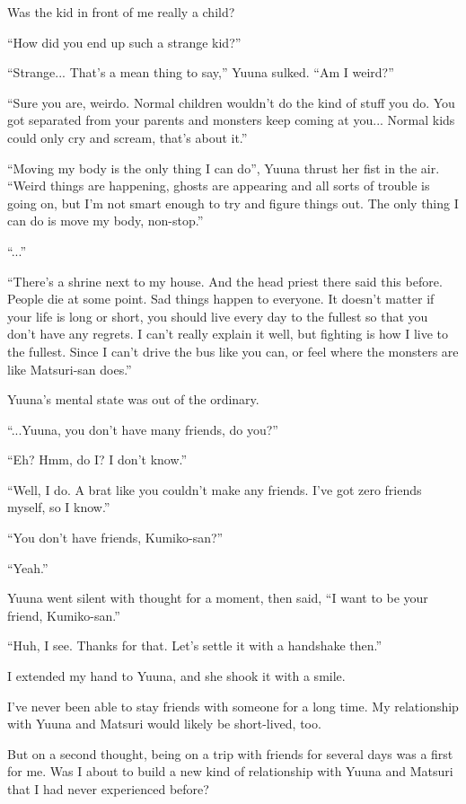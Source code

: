 Was the kid in front of me really a child?

``How did you end up such a strange kid?''

``Strange... That's a mean thing to say,'' Yuuna sulked. ``Am I weird?''

``Sure you are, weirdo. Normal children wouldn't do the kind of stuff you do. You got separated from your parents and monsters keep coming at you... Normal kids could only cry and scream, that's about it.''

``Moving my body is the only thing I can do'', Yuuna thrust her fist in the air. ``Weird things are happening, ghosts are appearing and all sorts of trouble is going on, but I'm not smart enough to try and figure things out. The only thing I can do is move my body, non-stop.''

``...''

``There's a shrine next to my house. And the head priest there said this before. People die at some point. Sad things happen to everyone. It doesn't matter if your life is long or short, you should live every day to the fullest so that you don't have any regrets. I can't really explain it well, but fighting is how I live to the fullest. Since I can't drive the bus like you can, or feel where the monsters are like Matsuri-san does.''

Yuuna's mental state was out of the ordinary.

``...Yuuna, you don't have many friends, do you?''

``Eh? Hmm, do I? I don't know.''

``Well, I do. A brat like you couldn't make any friends. I've got zero friends myself, so I know.''

``You don't have friends, Kumiko-san?''

``Yeah.''

Yuuna went silent with thought for a moment, then said, ``I want to be your friend, Kumiko-san.''

``Huh, I see. Thanks for that. Let's settle it with a handshake then.''

I extended my hand to Yuuna, and she shook it with a smile.

I've never been able to stay friends with someone for a long time. My relationship with Yuuna and Matsuri would likely be short-lived, too.

But on a second thought, being on a trip with friends for several days was a first for me. Was I about to build a new kind of relationship with Yuuna and Matsuri that I had never experienced before?

